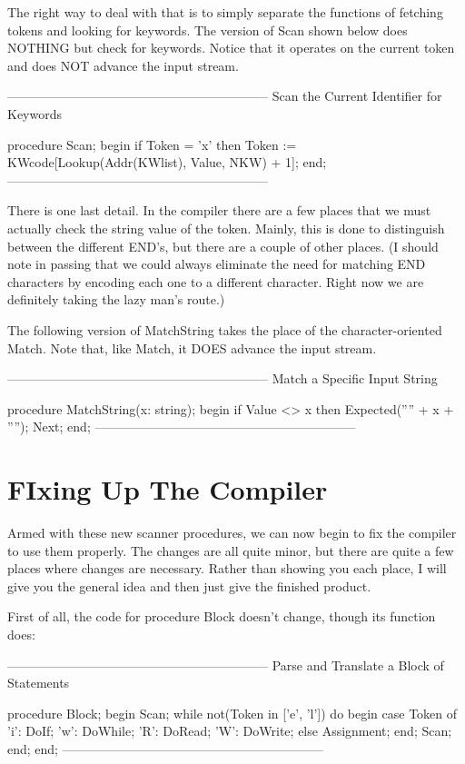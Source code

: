 \documentclass[float=false, crop=false]{standalone}
\begin{document}
The right way to deal with that is to simply separate the functions of fetching
tokens and looking for keywords. The version of Scan shown below does NOTHING
but check for keywords. Notice that it operates on the current token and does
NOT advance the input stream.

\begin{code}
{--------------------------------------------------------------}
{ Scan the Current Identifier for Keywords }

procedure Scan;
begin
   if Token = 'x' then
      Token := KWcode[Lookup(Addr(KWlist), Value, NKW) + 1];
end;
{--------------------------------------------------------------}
\end{code}

There is one last detail. In the compiler there are a few places that we must
actually check the string value of the token. Mainly, this is done to
distinguish between the different END's, but there are a couple of other places.
(I should note in passing that we could always eliminate the need for matching
END characters by encoding each one to a different character. Right now we are
definitely taking the lazy man's route.)

The following version of MatchString takes the place of the character-oriented
Match. Note that, like Match, it DOES advance the input stream.

\begin{code}
{--------------------------------------------------------------}
{ Match a Specific Input String }

procedure MatchString(x: string);
begin
   if Value <> x then Expected('''' + x + '''');
   Next;
end;
{--------------------------------------------------------------}
\end{code}

\section{FIxing Up The Compiler}

Armed with these new scanner procedures, we can now begin to fix the compiler to
use them properly. The changes are all quite minor, but there are quite a few
places where changes are necessary. Rather than showing you each place, I will
give you the general idea and then just give the finished product.


First of all, the code for procedure Block doesn't change, though its function
does:

\begin{code}
{--------------------------------------------------------------}
{ Parse and Translate a Block of Statements }

procedure Block;
begin
   Scan;
   while not(Token in ['e', 'l']) do begin
      case Token of
       'i': DoIf;
       'w': DoWhile;
       'R': DoRead;
       'W': DoWrite;
      else Assignment;
      end;
      Scan;
   end;
end;
{--------------------------------------------------------------}
\end{code}
\end{document}
